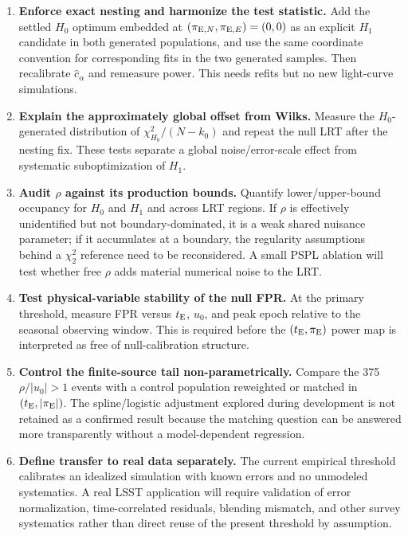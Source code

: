 \documentclass[11pt,a4paper]{article}
\newcommand{\pen}{\pi_{{\rm E},N}}
\newcommand{\pee}{\pi_{{\rm E},E}}
\newcommand{\te}{t_{\rm E}}
\newcommand{\Hnull}{H_0}
\newcommand{\Halt}{H_1}
\begin{document}
\begin{enumerate}[leftmargin=2em]
    \item \textbf{Enforce exact nesting and harmonize the test statistic.}  Add the settled
    $\Hnull$ optimum embedded at $(\pen,\pee)=(0,0)$ as an explicit $\Halt$ candidate in both
    generated populations, and use the same coordinate convention for corresponding fits in the
    two generated samples.  Then recalibrate $\widehat c_\alpha$ and remeasure power.  This
    needs refits but no new light-curve simulations.

    \item \textbf{Explain the approximately global offset from Wilks.}  Measure the
    $\Hnull$-generated distribution of $\chi^2_{\Hnull}/(N-k_0)$ and repeat the null LRT after
    the nesting fix.  These tests separate a global noise/error-scale effect from systematic
    suboptimization of $\Halt$.

    \item \textbf{Audit $\rho$ against its production bounds.}  Quantify lower/upper-bound
    occupancy for $\Hnull$ and $\Halt$ and across LRT regions.  If $\rho$ is effectively
    unidentified but not boundary-dominated, it is a weak shared nuisance parameter; if it
    accumulates at a boundary, the regularity assumptions behind a $\chi^2_2$ reference need to
    be reconsidered.  A small PSPL ablation will test whether free $\rho$ adds material
    numerical noise to the LRT.

    \item \textbf{Test physical-variable stability of the null FPR.}  At the primary threshold,
    measure FPR versus $\te$, $u_0$, and peak epoch relative to the seasonal observing window.
    This is required before the $(\te,\pi_{\rm E})$ power map is interpreted as free of
    null-calibration structure.

    \item \textbf{Control the finite-source tail non-parametrically.}  Compare the 375
    $\rho/|u_0|>1$ events with a control population reweighted or matched in
    $(\te,|\pi_{\rm E}|)$.  The spline/logistic adjustment explored during development is not
    retained as a confirmed result because the matching question can be answered more
    transparently without a model-dependent regression.

    \item \textbf{Define transfer to real data separately.}  The current empirical threshold
    calibrates an idealized simulation with known errors and no unmodeled systematics.  A real
    LSST application will require validation of error normalization, time-correlated residuals,
    blending mismatch, and other survey systematics rather than direct reuse of the present
    threshold by assumption.
\end{enumerate}
\end{document}
